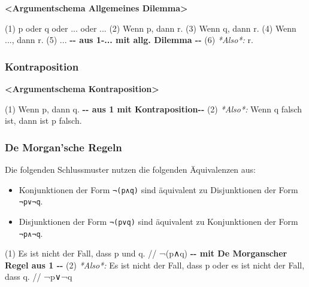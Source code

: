 \documentclass[
  english,
  a4paper,
]{article}
\newenvironment{Shaded}{\begin{snugshade}}{\end{snugshade}}
\newcommand{\AlertTok}[1]{\textcolor[rgb]{0.02,0.51,0.79}{\textbf{#1}}}
\newcommand{\CommentTok}[1]{\textcolor[rgb]{0.54,0.53,0.53}{#1}}
\newcommand{\ErrorTok}[1]{\textcolor[rgb]{0.02,0.51,0.79}{#1}}
\newcommand{\FloatTok}[1]{\textcolor[rgb]{0.12,0.11,0.11}{\textit{#1}}}
\newcommand{\NormalTok}[1]{\textcolor[rgb]{0.12,0.11,0.11}{#1}}
\newcommand{\WarningTok}[1]{\textcolor[rgb]{0.46,0.73,0.89}{\textbf{#1}}}
\providecommand{\tightlist}{%
  \setlength{\itemsep}{0pt}\setlength{\parskip}{0pt}}
\renewenvironment{Shaded}{\centering \begin{mdframed}[style=codedefault]}{\end{mdframed}}%
\newenvironment{Shaded}{\centering \begin{mdframed}[style=codedefault]}{\end{mdframed}}%
\begin{document}
\begin{Shaded}
\begin{Highlighting}[]
\AlertTok{\textless{}Argumentschema Allgemeines Dilemma\textgreater{}}

\ErrorTok{(1)}\NormalTok{ p oder q oder ... oder ...}
\ErrorTok{(2)}\NormalTok{ Wenn p, dann r.}
\ErrorTok{(3)}\NormalTok{ Wenn q, dann r.}
\ErrorTok{(4)}\NormalTok{ Wenn ..., dann r.}
\ErrorTok{(5)}\NormalTok{ ...}
\WarningTok{{-}{-} aus 1{-}... mit allg. Dilemma {-}{-}}
\ErrorTok{(6)}\FloatTok{ *Also*:}\NormalTok{ r.}
\end{Highlighting}
\end{Shaded}

\subsubsection{Kontraposition}\label{kontraposition}

\begin{Shaded}
\begin{Highlighting}[]
\AlertTok{\textless{}Argumentschema Kontraposition\textgreater{}}

\ErrorTok{(1)}\NormalTok{ Wenn p, dann q.}
\WarningTok{{-}{-} aus 1 mit Kontraposition{-}{-}}
\ErrorTok{(2)}\FloatTok{ *Also*:}\NormalTok{ Wenn q falsch ist, dann ist p falsch.}
\end{Highlighting}
\end{Shaded}

\subsubsection{De Morgan'sche Regeln}\label{de-morgansche-regeln}

Die folgenden Schlussmuster nutzen die folgenden Äquivalenzen aus:

\begin{itemize}
\tightlist
\item
  Konjunktionen der Form \texttt{¬(p∧q)} sind äquivalent zu
  Disjunktionen der Form \texttt{¬p∨¬q}.
\item
  Disjunktionen der Form \texttt{¬(p∨q)} sind äquivalent zu
  Konjunktionen der Form \texttt{¬p∧¬q}.
\end{itemize}

\begin{Shaded}
\begin{Highlighting}[]
\ErrorTok{(1)}\NormalTok{ Es ist nicht der Fall, dass p und q.}
  \CommentTok{// ¬(p∧q)}
\WarningTok{{-}{-} mit De Morgan\textquotesingle{}scher Regel aus 1 {-}{-}}
\ErrorTok{(2)}\FloatTok{ *Also*:}\NormalTok{ Es ist nicht der Fall, dass p oder es ist nicht der Fall, dass q.}
  \CommentTok{// ¬p∨¬q}
\end{Highlighting}
\end{Shaded}
\end{document}

